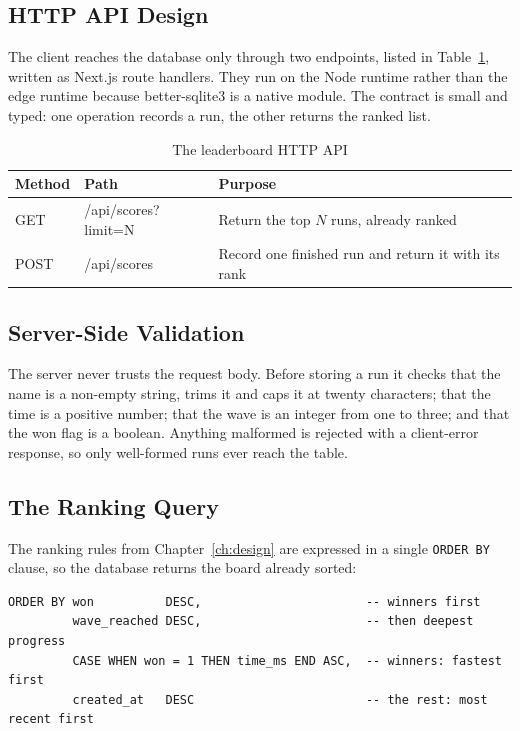 \documentclass[12pt,a4paper]{report}
\begin{document}
\subsection{HTTP API Design}

The client reaches the database only through two endpoints, listed in
Table~\ref{tab:api}, written as Next.js route handlers. They run on the Node
runtime rather than the edge runtime because better-sqlite3 is a native module.
The contract is small and typed: one operation records a run, the other returns
the ranked list.

\begin{table}[htbp]
\centering
\caption{The leaderboard HTTP API}
\label{tab:api}
\begin{tabular}{|p{1.4cm}|p{3.2cm}|p{7.4cm}|}
\hline
Method & Path & Purpose \\
\hline
GET & /api/scores?limit=N & Return the top $N$ runs, already ranked \\
\hline
POST & /api/scores & Record one finished run and return it with its rank \\
\hline
\end{tabular}
\end{table}

\subsection{Server-Side Validation}

The server never trusts the request body. Before storing a run it checks that
the name is a non-empty string, trims it and caps it at twenty characters; that
the time is a positive number; that the wave is an integer from one to three;
and that the won flag is a boolean. Anything malformed is rejected with a
client-error response, so only well-formed runs ever reach the table.

\subsection{The Ranking Query}

The ranking rules from Chapter~\ref{ch:design} are expressed in a single
\texttt{ORDER BY} clause, so the database returns the board already sorted:

\begin{verbatim}
ORDER BY won          DESC,                       -- winners first
         wave_reached DESC,                       -- then deepest progress
         CASE WHEN won = 1 THEN time_ms END ASC,  -- winners: fastest first
         created_at   DESC                        -- the rest: most recent first
\end{verbatim}
\end{document}
